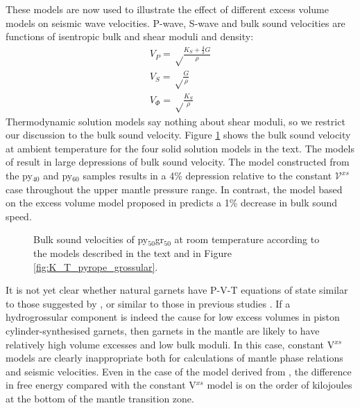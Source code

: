 These models are now used to illustrate the effect of different excess volume models on seismic wave velocities. P-wave, S-wave and bulk sound velocities are functions of isentropic bulk and shear moduli and density:
\begin{eqnarray}
V_P = \sqrt \frac{K_S + \frac{4}{3} G }{\rho} \\
V_S = \sqrt \frac{G}{\rho} \\
V_\Phi = \sqrt \frac{K_S}{\rho}
\end{eqnarray}
Thermodynamic solution models say nothing about shear moduli, so we restrict our discussion to the bulk sound velocity. Figure \ref{fig:bulk_sound_garnet} shows the bulk sound velocity at ambient temperature for the four solid solution models in the text. The models of \cite{DCW2015} result in large depressions of bulk sound velocity. The model constructed from the py$_{40}$ and py$_{60}$ samples results in a 4\% depression relative to the constant $\mathcal{V}^{xs}$ case throughout the upper mantle pressure range. In contrast, the model based on the excess volume model proposed in \cite{GCT1996} predicts a 1\% decrease in bulk sound speed. 

\begin{figure}[ht!]
  \centering
  \caption{Bulk sound velocities of py$_{50}$gr$_{50}$ at room temperature according to the models described in the text and in Figure \ref{fig:K_T_pyrope_grossular}.}
  \label{fig:bulk_sound_garnet}
\end{figure}

It is not yet clear whether natural garnets have P-V-T equations of state similar to those suggested by \cite{DCW2015}, or similar to those in previous studies \citep{NCK1977, BG1997, GCT1996}. If a hydrogrossular component is indeed the cause for low excess volumes in piston cylinder-synthesised garnets, then garnets in the mantle are likely to have relatively high volume excesses and low bulk moduli. In this case, constant V$^{xs}$ models are clearly inappropriate both for calculations of mantle phase relations and seismic velocities. Even in the case of the model derived from \cite{GCT1996}, the difference in free energy compared with the constant V$^{xs}$ model is on the order of kilojoules at the bottom of the mantle transition zone. 

